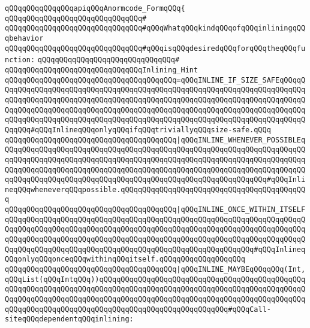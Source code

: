 \newline
\verb|qQQqqQQqqQQqqQQqapiqQQqAnormcode_FormqQQq{|\newline
\verb|qQQqqQQqqQQqqQQqqQQqqQQqqQQqqQQq#|\newline
\newline
\verb|qQQqqQQqqQQqqQQqqQQqqQQqqQQqqQQq#qQQqWhatqQQqkindqQQqofqQQqinliningqQQqbehavior|\newline
\verb|qQQqqQQqqQQqqQQqqQQqqQQqqQQqqQQq#qQQqisqQQqdesiredqQQqforqQQqtheqQQqfunction:|\newline
\verb|qQQqqQQqqQQqqQQqqQQqqQQqqQQqqQQq#|\newline
\verb|qQQqqQQqqQQqqQQqqQQqqQQqqQQqqQQqInlining_Hint|\newline
\verb|qQQqqQQqqQQqqQQqqQQqqQQqqQQqqQQqqQQqqQQq=qQQqINLINE_IF_SIZE_SAFEqQQqqQQqqQQqqQQqqQQqqQQqqQQqqQQqqQQqqQQqqQQqqQQqqQQqqQQqqQQqqQQqqQQqqQQqqQQqqQQqqQQqqQQqqQQqqQQqqQQqqQQqqQQqqQQqqQQqqQQqqQQqqQQqqQQqqQQqqQQqqQQqqQQqqQQqqQQqqQQqqQQqqQQqqQQqqQQqqQQqqQQqqQQqqQQqqQQqqQQqqQQqqQQqqQQqqQQqqQQqqQQqqQQqqQQqqQQqqQQqqQQqqQQqqQQqqQQqqQQqqQQqqQQqqQQqqQQqqQQqqQQqqQQqqQQq#qQQqInlineqQQqonlyqQQqifqQQqtriviallyqQQqsize-safe.qQQq|\newline
\verb|qQQqqQQqqQQqqQQqqQQqqQQqqQQqqQQqqQQqqQQq|\verb#|qQQqINLINE_WHENEVER_POSSIBLEqQQqqQQqqQQqqQQqqQQqqQQqqQQqqQQqqQQqqQQqqQQqqQQqqQQqqQQqqQQqqQQqqQQqqQQqqQQqqQQqqQQqqQQqqQQqqQQqqQQqqQQqqQQqqQQqqQQqqQQqqQQqqQQqqQQqqQQqqQQqqQQqqQQqqQQqqQQqqQQqqQQqqQQqqQQqqQQqqQQqqQQqqQQqqQQqqQQqqQQqqQQqqQQqqQQqqQQqqQQqqQQqqQQqqQQqqQQqqQQqqQQqqQQqqQQqqQQqqQQqqQQqqQQqqQQq#\verb|#qQQqInlineqQQqwheneverqQQqpossible.qQQqqQQqqQQqqQQqqQQqqQQqqQQqqQQqqQQqqQQqqQQq|\newline
\verb|qQQqqQQqqQQqqQQqqQQqqQQqqQQqqQQqqQQqqQQq|\verb#|qQQqINLINE_ONCE_WITHIN_ITSELFqQQqqQQqqQQqqQQqqQQqqQQqqQQqqQQqqQQqqQQqqQQqqQQqqQQqqQQqqQQqqQQqqQQqqQQqqQQqqQQqqQQqqQQqqQQqqQQqqQQqqQQqqQQqqQQqqQQqqQQqqQQqqQQqqQQqqQQqqQQqqQQqqQQqqQQqqQQqqQQqqQQqqQQqqQQqqQQqqQQqqQQqqQQqqQQqqQQqqQQqqQQqqQQqqQQqqQQqqQQqqQQqqQQqqQQqqQQqqQQqqQQqqQQqqQQqqQQqqQQqqQQqqQQq#\verb|#qQQqInlineqQQqonlyqQQqonceqQQqwithinqQQqitself.qQQqqQQqqQQqqQQqqQQq|\newline
\verb|qQQqqQQqqQQqqQQqqQQqqQQqqQQqqQQqqQQqqQQq|\verb#|qQQqINLINE_MAYBEqQQqqQQq(Int,qQQqList(qQQqIntqQQq))qQQqqQQqqQQqqQQqqQQqqQQqqQQqqQQqqQQqqQQqqQQqqQQqqQQqqQQqqQQqqQQqqQQqqQQqqQQqqQQqqQQqqQQqqQQqqQQqqQQqqQQqqQQqqQQqqQQqqQQqqQQqqQQqqQQqqQQqqQQqqQQqqQQqqQQqqQQqqQQqqQQqqQQqqQQqqQQqqQQqqQQqqQQqqQQqqQQqqQQqqQQqqQQqqQQqqQQqqQQqqQQqqQQqqQQqqQQqqQQq#\verb|#qQQqCall-siteqQQqdependentqQQqinlining:|\newline
